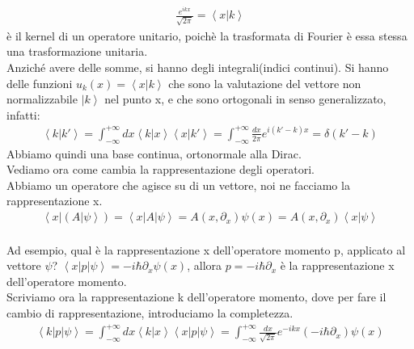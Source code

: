\begin{flushleft}
\begin{equation}
\begin{split}
\frac{e^{ikx}}{\sqrt{2\pi}}=\left\langle x|k\right\rangle
\end{split}\end{equation} è il kernel di un operatore unitario, poichè la trasformata di Fourier è essa stessa una trasformazione unitaria.\\
Anziché avere delle somme, si hanno degli integrali(indici continui).
Si hanno delle funzioni $u_{k}\left(x\right)=\left\langle x|k\right\rangle$ che sono la valutazione del vettore non normalizzabile $\left|k\right\rangle$ nel punto x, e che sono ortogonali in senso generalizzato, infatti:\\
\begin{equation}\begin{split}
\left\langle k|k'\right\rangle=\int^{+\infty }_{-\infty } {dx \left\langle k|x\right\rangle \left\langle x|k'\right\rangle}=
\int^{+\infty }_{-\infty } {\frac{dx}{2\pi} e^{i\left(k'-k\right)x}}=\delta\left(k'-k\right)
\end{split}\end{equation}
Abbiamo quindi una base continua, ortonormale alla Dirac.\\ 
Vediamo ora come cambia la rappresentazione degli operatori.\\
Abbiamo un operatore che agisce su di un vettore, noi ne facciamo la rappresentazione x.\\
\begin{equation}\begin{split}
\left\langle x|\left(A|\psi\right\rangle\right)=\left\langle x|A|\psi\right\rangle= A\left(x,\partial_x\right) \psi\left(x\right)= A\left(x,\partial_x\right)\left\langle x|\psi\right\rangle
\end{split}\end{equation}\\
Ad esempio, qual è la rappresentazione x dell'operatore momento p, applicato al vettore $\psi$?
$\left\langle x|p|\psi\right\rangle=-i\hbar\partial_x\psi\left(x\right)$, allora $p=-i\hbar\partial_x$ è la rappresentazione x dell'operatore momento.\\
Scriviamo ora la rappresentazione k dell'operatore momento, dove per fare il cambio di rappresentazione, introduciamo la completezza.\\
\begin{equation}\begin{split}\left\langle k|p|\psi\right\rangle=\int^{+\infty }_{-\infty } {dx \left\langle k|x\right\rangle \left\langle x|p|\psi\right\rangle}=\int^{+\infty }_{-\infty } {\frac{dx}{\sqrt{2\pi}} e^{-ikx}\left(-i\hbar\partial_x\right)\psi\left(x\right)}

\end{split}
\end{equation}
\end{flushleft}

